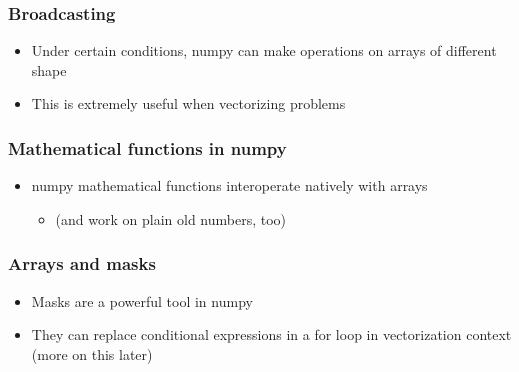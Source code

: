 \documentclass[9pt]{beamer}
\begin{document}
\begin{frame}
  \frametitle{Broadcasting}
  
  
  \begin{itemize}
  \item Under certain conditions, numpy can make operations on arrays of
    different shape
  \item This is extremely useful when vectorizing problems 
  \end{itemize}
\end{frame}


\begin{frame}
  \frametitle{Mathematical functions in numpy}
  
  
  \begin{itemize}
  \item numpy mathematical functions interoperate natively with arrays
    \begin{itemize}
    \item (and work on plain old numbers, too)
    \end{itemize}
  \end{itemize}
\end{frame}


\begin{frame}
  \frametitle{Arrays and masks}
  
  
  \begin{itemize}
  \item Masks are a powerful tool in numpy
  \item They can replace conditional expressions in a for loop in
    vectorization context (more on this later)
  \end{itemize}
\end{frame}
\end{document}
